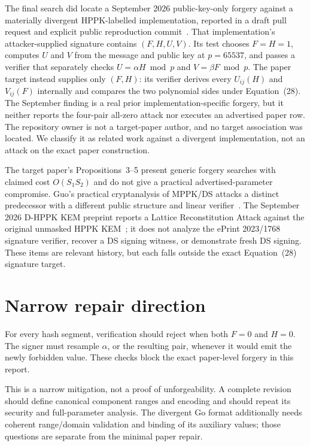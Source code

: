 \documentclass[10pt,a4paper]{article}
\begin{document}
The final search did locate a September 2026 public-key-only forgery against a
materially divergent HPPK-labelled implementation, reported in a draft pull
request and explicit public reproduction commit~\cite{hppk2pr}. That
implementation's attacker-supplied signature contains $(F,H,U,V)$. Its test
chooses $F=H=1$, computes $U$ and $V$ from the message and public key at
$p=65537$, and passes a verifier that separately checks
$U=\alpha H\bmod p$ and $V=\beta F\bmod p$. The paper target instead supplies
only $(F,H)$: its verifier derives every $U_{ij}(H)$ and $V_{ij}(F)$ internally
and compares the two polynomial sides under Equation~(28). The September
finding is a real prior implementation-specific forgery, but it neither
reports the four-pair all-zero attack nor executes an advertised paper row.
The repository owner is not a target-paper author, and no target association
was located. We classify it as related work against a divergent implementation,
not an attack on the exact paper construction.

The target paper's Propositions~3--5 present generic forgery searches with
claimed cost $O(S_1S_2)$ and do not give a practical advertised-parameter
compromise. Guo's
practical cryptanalysis of MPPK/DS attacks a distinct predecessor with a
different public structure and linear verifier~\cite{guo}. The September 2026
D-HPPK KEM preprint reports a Lattice Reconstitution Attack against the
original unmasked HPPK KEM~\cite{dhppk}; it does not analyze the ePrint
2023/1768 signature verifier, recover a DS signing witness, or demonstrate
fresh DS signing. These items are relevant history, but each falls outside the
exact Equation~(28) signature target.

\section{Narrow repair direction}

For every hash segment, verification should reject when both $F=0$ and $H=0$.
The signer must resample $\alpha$, or the resulting pair, whenever it would
emit the newly forbidden value. These checks block the exact paper-level
forgery in this report.

This is a narrow mitigation, not a proof of unforgeability. A complete revision
should define canonical component ranges and encoding and should repeat its
security and full-parameter analysis. The divergent Go format additionally
needs coherent range/domain validation and binding of its auxiliary values;
those questions are separate from the minimal paper repair.
\end{document}
